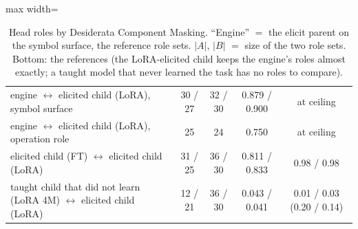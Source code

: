 \documentclass[11pt]{article}
\begin{document}
\begin{enumerate}[label=\textbf{M\arabic*}, leftmargin=*, itemsep=1.2em, resume]
\begin{table}[h]
\begin{adjustbox}{max width=\textwidth}
\begin{tabular}{lcccc}
\midrule
engine $\leftrightarrow$ elicited child (LoRA), symbol surface & 30 / 27 & 32 / 30 & 0.879 / 0.900 & at ceiling \\
engine $\leftrightarrow$ elicited child (LoRA), operation role & 25 & 24 & 0.750 & at ceiling \\
elicited child (FT) $\leftrightarrow$ elicited child (LoRA) & 31 / 25 & 36 / 30 & 0.811 / 0.833 & 0.98 / 0.98 \\
taught child that did not learn (LoRA 4M) $\leftrightarrow$ elicited child (LoRA) & 12 / 21 & 36 / 30 & 0.043 / 0.041 & 0.01 / 0.03 (0.20 / 0.14) \\
\bottomrule
\end{tabular}
\end{adjustbox}
\caption{Head roles by Desiderata Component Masking. ``Engine'' $=$ the elicit parent on the
symbol surface, the reference role sets. $|A|$, $|B|$ $=$ size of the two role sets. Bottom: the
references (the LoRA-elicited child keeps the engine's roles almost exactly; a taught model that
never learned the task has no roles to compare).}
\label{tab:dcm}
\end{table}

\end{enumerate}
\end{document}

